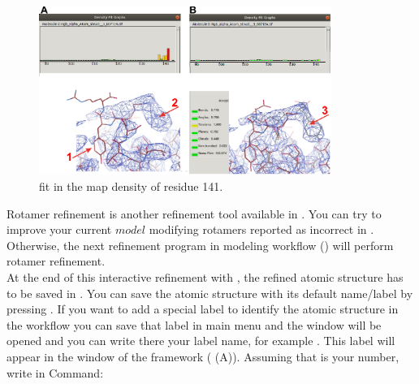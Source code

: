   \begin{figure}[H]
  \centering 
  \captionsetup{width=.7\linewidth} 
  \includegraphics[width=0.85\textwidth]{Images/Fig28}
  \caption{\coot fit in the map density of residue  141.}
  \label{fig:coot_density_fit_analysis2}
  \end{figure}
  
 Rotamer refinement is another refinement tool available in \coot. You can try to improve your current $model$ modifying rotamers reported as incorrect in . Otherwise, the next refinement program in modeling workflow (\phenix {}) will perform rotamer refinement.\\
 
 At the end of this interactive refinement with \coot, the refined atomic structure has to be saved in \scipion. You can save the atomic structure with its default name/label by pressing . If you want to add a special label to identify the atomic structure in the \scipion workflow you can save that label in \coot main menu  and the  window will be opened and you can write there your label name, for example . This label will appear in the  window of the \scipion framework ( (A)). Assuming that  is your  number, write in Command:\\
 \\
 \keys{\return}\\
 
